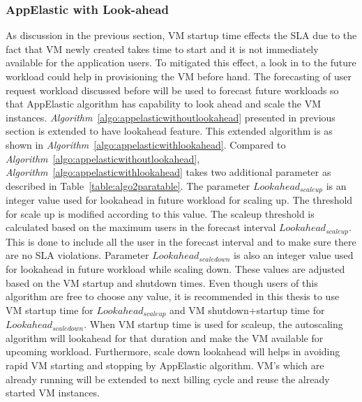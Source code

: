 \subsubsection{AppElastic with Look-ahead}
\label{subs:AppElastic with Look-ahead}
As discussion in the previous section, VM startup time effects the SLA due to the fact that VM newly created takes time to start and  it is not immediately available for the application users. To mitigated this effect, a look in to the future workload could help in provisioning the VM before hand. The forecasting of user request workload discussed before will be used to forecast future workloads so that AppElastic algorithm has capability to look ahead and scale the VM instances. \textit{Algorithm}~\ref{algo:appelasticwithoutlookahead} presented in previous section is extended to have lookahead feature. This extended algorithm is as shown in  \textit{Algorithm}~\ref{algo:appelasticwithlookahead}. Compared to  \textit{Algorithm}~\ref{algo:appelasticwithoutlookahead}, \textit{Algorithm}~\ref{algo:appelasticwithlookahead} takes two additional parameter as described in Table~\ref{table:algo2paratable}. The parameter \( Lookahead_{scaleup} \) is an integer value used for lookahead in future workload for scaling  up. The threshold for scale up is modified according to this value. The scaleup threshold is calculated based on the maximum users in the forecast interval \( Lookahead_{scaleup} \). This is done to include all the user in the forecast interval and to make sure there are no SLA violations. Parameter \( Lookahead_{scaledown} \) is also an integer value used for lookahead in future workload while scaling down. These values are adjusted based on the VM startup and shutdown times. Even though users of this algorithm are free to choose any value, it is recommended in this thesis to use VM startup time for \( Lookahead_{scaleup} \) and VM shutdown+startup time for \( Lookahead_{scaledown} \). When VM startup time is used for scaleup, the autoscaling algorithm will lookahead for that duration and make the VM available for upcoming workload. Furthermore, scale down lookahead will helps in avoiding rapid VM starting and stopping by AppElastic algorithm. VM's which are already running will be extended to next billing cycle and reuse the already started VM instances.


\begin{flushleft}
  \begin{table}
    \caption{Additional input parameters to \textit{Algorithm}~\ref{algo:appelasticwithlookahead}}
     \label{table:algo2paratable}
\end{table}
\end{flushleft}

